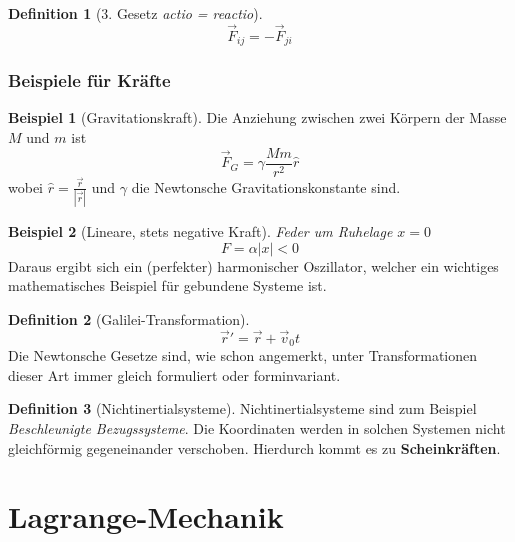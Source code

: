 \documentclass[oneside]{book}
\theoremstyle{definition}
\newtheorem*{definition*}{Definition}
\newtheorem*{beispiel*}{Beispiel}
\begin{document}
\begin{definition*}[3. Gesetz \textit{actio = reactio}]
	\begin{equation*}
	\vec{F}_{ij} = -\vec{F}_{ji}
	\end{equation*}
\end{definition*}

\subsubsection{Beispiele für Kräfte}

\begin{beispiel*}[Gravitationskraft]
	Die Anziehung zwischen zwei Körpern der Masse $M$ und $m$ ist 
	$$\vec{F}_G = \gamma \frac{M m}{r^2} \hat{r}$$
	wobei $\hat{r} = \frac{\vec{r}}{|\vec{r}|}$ und $\gamma$ die Newtonsche Gravitationskonstante sind.
\end{beispiel*}



\begin{beispiel*}[Lineare, stets negative Kraft]
	\textit{Feder um Ruhelage $x = 0$}
	$$F = \alpha |x| < 0$$
	Daraus ergibt sich ein (perfekter) harmonischer Oszillator, welcher ein wichtiges mathematisches Beispiel für gebundene Systeme ist.
\end{beispiel*}

\begin{definition*}[Galilei-Transformation]
	$$ \vec{r}' = \vec{r} + \vec{v}_0t$$
	Die Newtonsche Gesetze sind, wie schon angemerkt, unter Transformationen dieser Art immer gleich formuliert oder forminvariant.
\end{definition*}

\begin{definition*}[Nichtinertialsysteme]
	Nichtinertialsysteme sind zum Beispiel \textit{Beschleunigte Bezugssysteme}. Die Koordinaten werden in solchen Systemen nicht gleichförmig gegeneinander verschoben. Hierdurch kommt es zu \textbf{Scheinkräften}.
\end{definition*}


\section{Lagrange-Mechanik}
\end{document}
